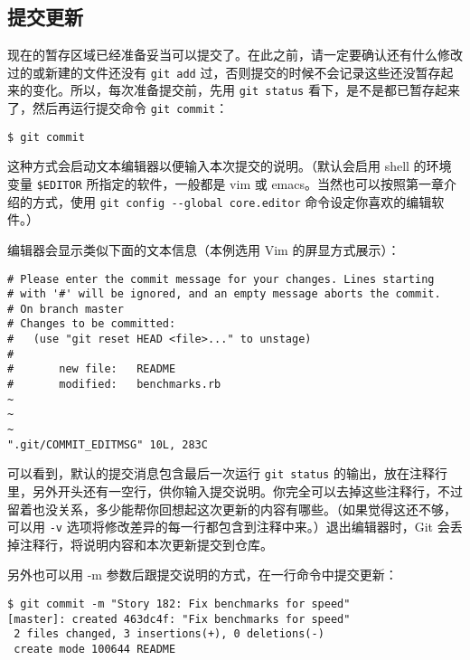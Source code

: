 \documentclass[a4paper]{book}
\begin{document}
\subsection{提交更新}

现在的暂存区域已经准备妥当可以提交了。在此之前，请一定要确认还有什么修改过的或新建的文件还没有 \texttt{git add} 过，否则提交的时候不会记录这些还没暂存起来的变化。所以，每次准备提交前，先用 \texttt{git status} 看下，是不是都已暂存起来了，然后再运行提交命令 \texttt{git commit}：

\begin{shaded}\begin{verbatim}
$ git commit
\end{verbatim}\end{shaded}

这种方式会启动文本编辑器以便输入本次提交的说明。（默认会启用 shell 的环境变量 \texttt{\$EDITOR} 所指定的软件，一般都是 vim 或 emacs。当然也可以按照第一章介绍的方式，使用 \texttt{git config -{}-global core.editor} 命令设定你喜欢的编辑软件。）

编辑器会显示类似下面的文本信息（本例选用 Vim 的屏显方式展示）：

\begin{shaded}\begin{verbatim}
# Please enter the commit message for your changes. Lines starting
# with '#' will be ignored, and an empty message aborts the commit.
# On branch master
# Changes to be committed:
#   (use "git reset HEAD <file>..." to unstage)
#
#       new file:   README
#       modified:   benchmarks.rb
~
~
~
".git/COMMIT_EDITMSG" 10L, 283C
\end{verbatim}\end{shaded}

可以看到，默认的提交消息包含最后一次运行 \texttt{git status} 的输出，放在注释行里，另外开头还有一空行，供你输入提交说明。你完全可以去掉这些注释行，不过留着也没关系，多少能帮你回想起这次更新的内容有哪些。（如果觉得这还不够，可以用 \texttt{-v} 选项将修改差异的每一行都包含到注释中来。）退出编辑器时，Git 会丢掉注释行，将说明内容和本次更新提交到仓库。

另外也可以用 -m 参数后跟提交说明的方式，在一行命令中提交更新：

\begin{shaded}\begin{verbatim}
$ git commit -m "Story 182: Fix benchmarks for speed"
[master]: created 463dc4f: "Fix benchmarks for speed"
 2 files changed, 3 insertions(+), 0 deletions(-)
 create mode 100644 README
\end{verbatim}\end{shaded}
\end{document}
